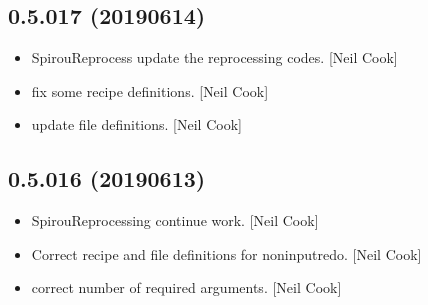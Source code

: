\documentclass[a4paper,10pt,english]{report}
\begin{document}
\subsection{0.5.017 (2019\sphinxhyphen{}06\sphinxhyphen{}14)}
\label{\detokenize{misc/changelog:id139}}\begin{itemize}
\item {} 
SpirouReprocess \sphinxhyphen{} update the reprocessing codes. {[}Neil Cook{]}

\item {} 
 \sphinxhyphen{} fix some recipe definitions. {[}Neil Cook{]}

\item {} 
 \sphinxhyphen{} update file definitions. {[}Neil Cook{]}

\end{itemize}


\subsection{0.5.016 (2019\sphinxhyphen{}06\sphinxhyphen{}13)}
\label{\detokenize{misc/changelog:id140}}\begin{itemize}
\item {} 
SpirouReprocessing \sphinxhyphen{} continue work. {[}Neil Cook{]}

\item {} 
Correct recipe and file definitions for non\sphinxhyphen{}input\sphinxhyphen{}redo. {[}Neil Cook{]}

\item {} 
 \sphinxhyphen{} correct number of required arguments. {[}Neil
Cook{]}

\end{itemize}
\end{document}
